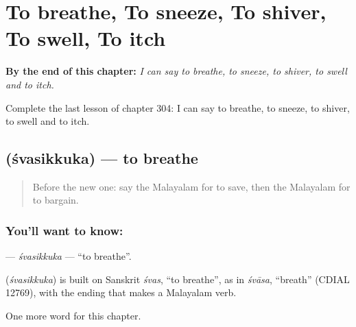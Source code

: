 
\chapter{To breathe, To sneeze, To shiver, To swell, To itch}
\label{ch:ml-to-breathe-to-sneeze-to-shiver-to-swell-to-itch}

\begin{chapteropening}
\textbf{By the end of this chapter:} \emph{I can say to breathe, to sneeze, to shiver, to swell and to itch.}

Complete the last lesson of chapter 304: I can say to breathe, to sneeze, to shiver, to swell and to itch.
\end{chapteropening}

\section[\texorpdfstring{\ml{ശ്വസിക്കുക} (śvasikkuka)}{ശ്വസിക്കുക (śvasikkuka)}]{ (śvasikkuka) — to breathe}

\label{lesson:ML-C304-svasikkuka}



\begin{quote}
Before the new one: say the Malayalam for to save, then the Malayalam for to bargain.
\end{quote}

\subsection*{You'll want to know: }
\textbf{} — \emph{śvasikkuka} — \textquotedblleft{}to breathe\textquotedblright{}.

\begin{cousinweb}
\textbf{} (\emph{śvasikkuka}) is built on Sanskrit \emph{śvas}, \textquotedblleft{}to breathe\textquotedblright{}, as in \emph{śvāsa}, \textquotedblleft{}breath\textquotedblright{} (CDIAL 12769), with the ending that makes a Malayalam verb.
\end{cousinweb}

\begin{grammarlens}[title={What you've built}]
One more word for this chapter.
\end{grammarlens}

